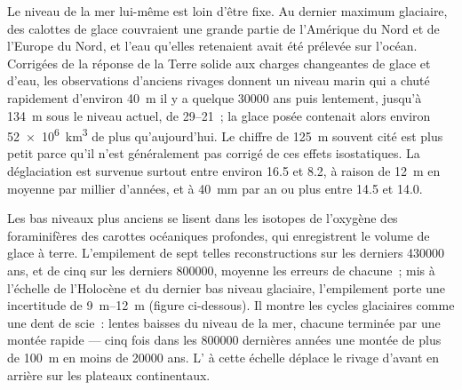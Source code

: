 Le niveau de la mer lui-même est loin d'être fixe. Au dernier maximum glaciaire, des calottes de glace
couvraient une grande partie de l'Amérique du Nord et de l'Europe du Nord, et l'eau qu'elles retenaient
avait été prélevée sur l'océan. Corrigées de la réponse de la Terre solide aux
charges changeantes de glace et d'eau, les observations d'anciens rivages donnent
un niveau marin qui a chuté rapidement d'environ \qty{40}{m} il y a quelque \num{30000} ans
puis lentement, jusqu'à \qty{134}{m} sous le niveau actuel, de \qtyrange{29}{21}{\ka}~;
la glace posée contenait alors environ \qty{52e6}{km^3} de plus qu'aujourd'hui. Le chiffre
de \qty{125}{m} souvent cité est plus petit parce qu'il n'est généralement pas corrigé de
ces effets isostatiques. La déglaciation est survenue surtout entre environ \qty{16.5}{\ka}
et \qty{8.2}{\ka}, à raison de \qty{12}{m} en moyenne par millier d'années, et à
\qty{40}{mm} par an ou plus entre \qty{14.5}{\ka} et \qty{14.0}{\ka}.

Les bas niveaux plus anciens se lisent dans les isotopes de l'oxygène des foraminifères des carottes
océaniques profondes, qui enregistrent le volume de glace à terre. L'empilement de sept telles
reconstructions sur les derniers \num{430000} ans, et de cinq sur les derniers
\num{800000}, moyenne les erreurs de chacune~; mis à l'échelle de l'Holocène et du
dernier bas niveau glaciaire, l'empilement porte une incertitude de
\qtyrange{9}{12}{m} (figure ci-dessous). Il montre les cycles glaciaires comme une dent de scie~:
lentes baisses du niveau de la mer, chacune terminée par une montée rapide --- cinq fois dans les
\num{800000} dernières années une montée de plus de \qty{100}{m} en moins de \num{20000}
ans. L' à cette échelle déplace le rivage d'avant en arrière sur les
plateaux continentaux.

